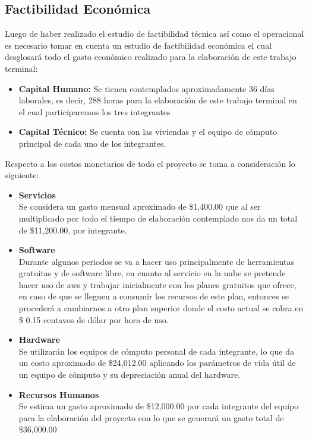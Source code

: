 \documentclass[12pt, a4paper, titlepage]{report}
\begin{document}
    	\subsection{Factibilidad Económica}
    	Luego de haber realizado el estudio de factibilidad técnica así como el operacional es necesario tomar en cuenta un estudio de factibilidad económica el cual desglosará todo el gasto económico realizado para la elaboración de este trabajo terminal:
    	\begin{itemize}
    		\item \textbf{Capital Humano:} Se tienen contemplados aproximadamente 36 días laborales, es decir, 288 horas para la elaboración de este trabajo terminal en el cual participaremos los tres integrantes
    		\item \textbf{Capital Técnico:} Se cuenta con las viviendas y el equipo de cómputo principal de cada uno de los integrantes.
    	\end{itemize}
    	Respecto a los costos monetarios de todo el proyecto se toma a consideración lo siguiente:
    	\begin{itemize}
    		\item \textbf{Servicios}\\
    		Se considera un gasto mensual aproximado de \$1,400.00 que al ser multiplicado por todo el tiempo de elaboración contemplado nos da un total de \$11,200.00, por integrante.
    		\item \textbf{Software} \\
    		Durante algunos periodos se va a hacer uso principalmente de herramientas gratuitas y de software libre, en cuanto al servicio en la nube se pretende hacer uso de \acrshort{aws} y trabajar inicialmente con los planes gratuitos que ofrece, en caso de que se lleguen a consumir los recursos de este plan, entonces se procederá a cambiarnos a otro plan superior donde el costo actual se cobra en \$ 0.15 centavos de dólar por hora de uso.
    		\item \textbf{Hardware}\\
    		Se utilizarán los equipos de cómputo personal de cada integrante, lo que da un costo aproximado de \$24,012.00 aplicando los parámetros de vida útil de un equipo de cómputo y su depreciación anual del hardware. 
    		\item \textbf{Recursos Humanos}\\
    		Se estima un gasto aproximado de \$12,000.00 por cada integrante del equipo para la elaboración del proyecto con lo que se generará un gasto total de \$36,000.00
    	\end{itemize}
\end{document}
